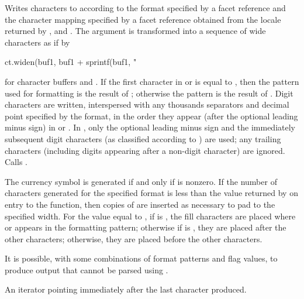 \begin{itemdescr}
\pnum
\effects
Writes characters to
according to the format specified by a
facet reference
and the character mapping specified by a
facet reference
obtained from the locale returned by
,
and
.
The argument
is transformed into a sequence of wide characters as if by

\begin{codeblock}
ct.widen(buf1, buf1 + sprintf(buf1, "%
\end{codeblock}

for character buffers
and
.
If the first character in
or
is equal to
,
then the pattern used for formatting is the result of
;
otherwise the pattern is the result of
.
Digit characters are written, interspersed with any thousands separators
and decimal point specified by the format, in the order they appear
(after the optional leading minus sign)
in
or
.
In
,
only the optional leading minus sign and the immediately subsequent
digit characters (as classified according to
)
are used; any trailing characters (including digits appearing
after a non-digit character) are ignored.
Calls
.

\pnum
\remarks
The currency symbol is generated if and only if
is nonzero.
If the number of characters generated for the specified format is less than the value
returned by
on entry to the function, then copies of
are inserted as necessary to pad to the specified width.
For the value
equal to
,
if
is , the fill characters are placed where
or
appears in the formatting pattern; otherwise if
is , they are placed after the other characters;
otherwise, they are placed before the other characters.
\begin{note}
It is possible, with some combinations of format patterns and flag values,
to produce output that cannot be parsed using
.
\end{note}

\pnum
\returns
An iterator pointing immediately after the last character produced.
\end{itemdescr}


